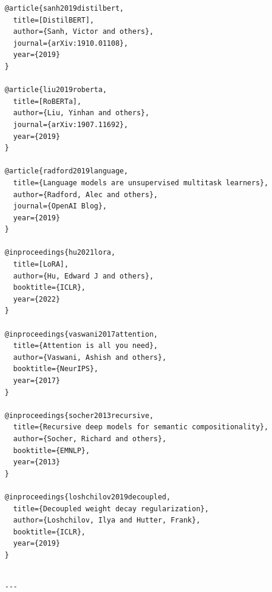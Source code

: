 \begin{lstlisting}
@article{sanh2019distilbert,
  title=[DistilBERT],
  author={Sanh, Victor and others},
  journal={arXiv:1910.01108},
  year={2019}
}

@article{liu2019roberta,
  title=[RoBERTa],
  author={Liu, Yinhan and others},
  journal={arXiv:1907.11692},
  year={2019}
}

@article{radford2019language,
  title={Language models are unsupervised multitask learners},
  author={Radford, Alec and others},
  journal={OpenAI Blog},
  year={2019}
}

@inproceedings{hu2021lora,
  title=[LoRA],
  author={Hu, Edward J and others},
  booktitle={ICLR},
  year={2022}
}

@inproceedings{vaswani2017attention,
  title={Attention is all you need},
  author={Vaswani, Ashish and others},
  booktitle={NeurIPS},
  year={2017}
}

@inproceedings{socher2013recursive,
  title={Recursive deep models for semantic compositionality},
  author={Socher, Richard and others},
  booktitle={EMNLP},
  year={2013}
}

@inproceedings{loshchilov2019decoupled,
  title={Decoupled weight decay regularization},
  author={Loshchilov, Ilya and Hutter, Frank},
  booktitle={ICLR},
  year={2019}
}
\end{lstlisting}
\begin{lstlisting}

---
\end{lstlisting}